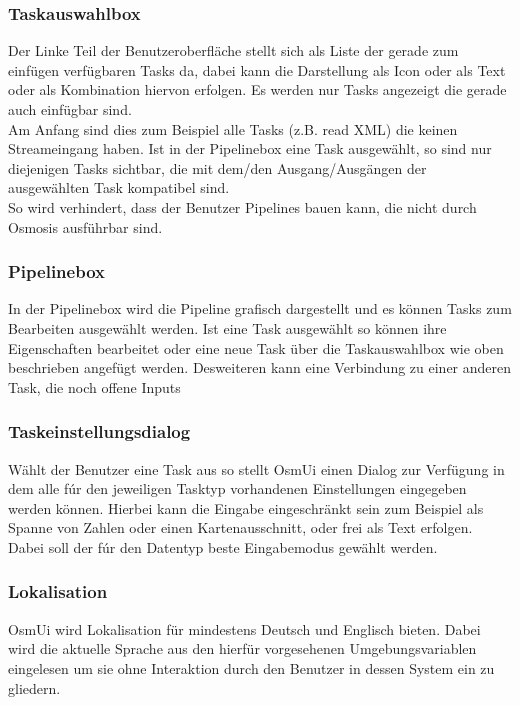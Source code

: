 \documentclass[a4paper,10pt]{scrartcl}
\begin{document}
\subsubsection{Taskauswahlbox}
Der Linke Teil der Benutzeroberfläche stellt sich als Liste der gerade zum einfügen verfügbaren Tasks da, dabei kann die Darstellung als Icon oder als Text oder 
als Kombination hiervon erfolgen. Es werden nur Tasks angezeigt die gerade auch einfügbar sind. \\
Am Anfang sind dies zum Beispiel alle Tasks (z.B. read XML) die keinen Streameingang haben. Ist in der Pipelinebox eine Task ausgewählt, so
sind nur diejenigen Tasks sichtbar, die mit dem/den Ausgang/Ausgängen der ausgewählten Task kompatibel sind.\\
So wird verhindert, dass der Benutzer Pipelines bauen kann, die nicht durch Osmosis ausführbar sind.
\subsubsection{Pipelinebox}
In der Pipelinebox wird die Pipeline grafisch dargestellt und es können Tasks zum Bearbeiten ausgewählt werden. Ist eine Task ausgewählt so können ihre Eigenschaften
bearbeitet oder eine neue Task über die Taskauswahlbox wie oben beschrieben angefügt werden. Desweiteren kann eine Verbindung zu einer anderen Task, die noch offene
Inputs
\subsubsection{Taskeinstellungsdialog}
Wählt der Benutzer eine Task aus so stellt OsmUi einen Dialog zur Verfügung in dem alle fúr den jeweiligen Tasktyp vorhandenen Einstellungen eingegeben werden können.
Hierbei kann die Eingabe eingeschränkt sein zum Beispiel als Spanne von Zahlen oder einen Kartenausschnitt, oder frei als Text erfolgen. Dabei soll der fúr
den Datentyp beste Eingabemodus gewählt werden.
\subsubsection{Lokalisation}
OsmUi wird Lokalisation für mindestens Deutsch und Englisch bieten. Dabei wird die aktuelle Sprache aus den hierfür vorgesehenen Umgebungsvariablen eingelesen um
sie ohne Interaktion durch den Benutzer in dessen System ein zu gliedern.
\end{document}
